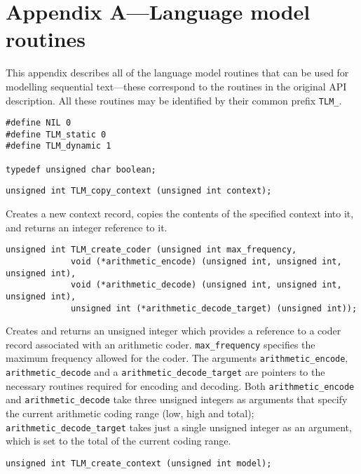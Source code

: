 \documentclass[11pt]{article}
\begin{document}
{\small
\section{Appendix A---Language model routines}

This appendix describes all of the language model routines that
can be used for modelling sequential text---these correspond
to the routines in the original API description. All these routines
may be identified by their common prefix \verb|TLM_|.

\begin{verbatim}
#define NIL 0
#define TLM_static 0
#define TLM_dynamic 1

typedef unsigned char boolean;
\end{verbatim}

\begin{verbatim}
unsigned int TLM_copy_context (unsigned int context);
\end{verbatim}

\vspace{-0.2cm}
Creates a new context record, copies the contents of the specified context
into it, and returns an integer reference to it.

\begin{verbatim}
unsigned int TLM_create_coder (unsigned int max_frequency,
             void (*arithmetic_encode) (unsigned int, unsigned int, unsigned int),
             void (*arithmetic_decode) (unsigned int, unsigned int, unsigned int),
             unsigned int (*arithmetic_decode_target) (unsigned int));
\end{verbatim}

\vspace{-0.2cm}
Creates and returns an unsigned integer which provides a reference to a coder
record associated with an arithmetic coder. \verb|max_frequency|
specifies the maximum frequency allowed for the coder. The arguments
\verb|arithmetic_encode|, \verb|arithmetic_decode| and a \verb|arithmetic_decode_target| are
pointers to the necessary routines required for encoding and decoding. Both
\verb|arithmetic_encode| and \verb|arithmetic_decode| take three unsigned integers
as arguments that specify the current arithmetic coding range (low, high
and total); \verb|arithmetic_decode_target| takes just a single unsigned integer
as an argument, which is set to the total of the current coding range.

\begin{verbatim}
unsigned int TLM_create_context (unsigned int model);
\end{verbatim}

}
\end{document}

